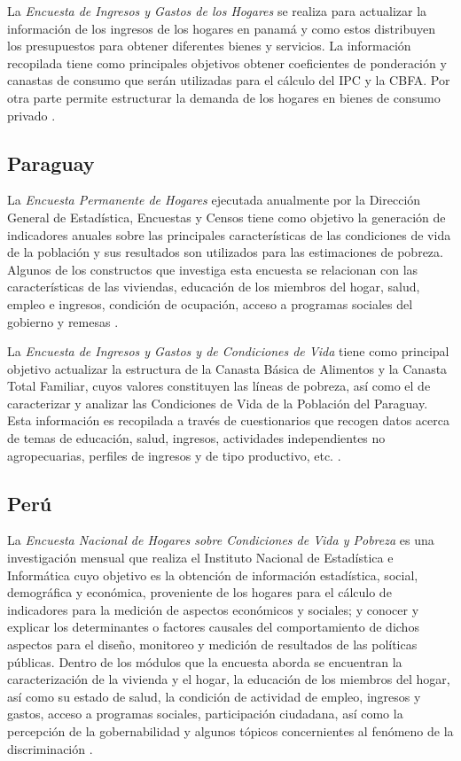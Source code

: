 \documentclass[
  12pt,
  spanish,
]{book}
\begin{document}
La \emph{Encuesta de Ingresos y Gastos de los Hogares} se realiza para actualizar la información de los ingresos de los hogares en panamá y como estos distribuyen los presupuestos para obtener diferentes bienes y servicios. La información recopilada tiene como principales objetivos obtener coeficientes de ponderación y canastas de consumo que serán utilizadas para el cálculo del IPC y la CBFA. Por otra parte permite estructurar la demanda de los hogares en bienes de consumo privado \citep{INEC2-PA}.

\hypertarget{paraguay}{%
\subsection{Paraguay}\label{paraguay}}

La \emph{Encuesta Permanente de Hogares} ejecutada anualmente por la Dirección General de Estadística, Encuestas y Censos tiene como objetivo la generación de indicadores anuales sobre las principales características de las condiciones de vida de la población y sus resultados son utilizados para las estimaciones de pobreza. Algunos de los constructos que investiga esta encuesta se relacionan con las características de las viviendas, educación de los miembros del hogar, salud, empleo e ingresos, condición de ocupación, acceso a programas sociales del gobierno y remesas \citep{DGEEC-PY}.

La \emph{Encuesta de Ingresos y Gastos y de Condiciones de Vida} tiene como principal objetivo actualizar la estructura de la Canasta Básica de Alimentos y la Canasta Total Familiar, cuyos valores constituyen las líneas de pobreza, así como el de caracterizar y analizar las Condiciones de Vida de la Población del Paraguay. Esta información es recopilada a través de cuestionarios que recogen datos acerca de temas de educación, salud, ingresos, actividades independientes no agropecuarias, perfiles de ingresos y de tipo productivo, etc. \citep{DGEEC2-PY}.

\hypertarget{peruxfa}{%
\subsection{Perú}\label{peruxfa}}

La \emph{Encuesta Nacional de Hogares sobre Condiciones de Vida y Pobreza} es una investigación mensual que realiza el Instituto Nacional de Estadística e Informática cuyo objetivo es la obtención de información estadística, social, demográfica y económica, proveniente de los hogares para el cálculo de indicadores para la medición de aspectos económicos y sociales; y conocer y explicar los determinantes o factores causales del comportamiento de dichos aspectos para el diseño, monitoreo y medición de resultados de las políticas públicas. Dentro de los módulos que la encuesta aborda se encuentran la caracterización de la vivienda y el hogar, la educación de los miembros del hogar, así como su estado de salud, la condición de actividad de empleo, ingresos y gastos, acceso a programas sociales, participación ciudadana, así como la percepción de la gobernabilidad y algunos tópicos concernientes al fenómeno de la discriminación \citep{INEI-PE_2016}.
\end{document}
